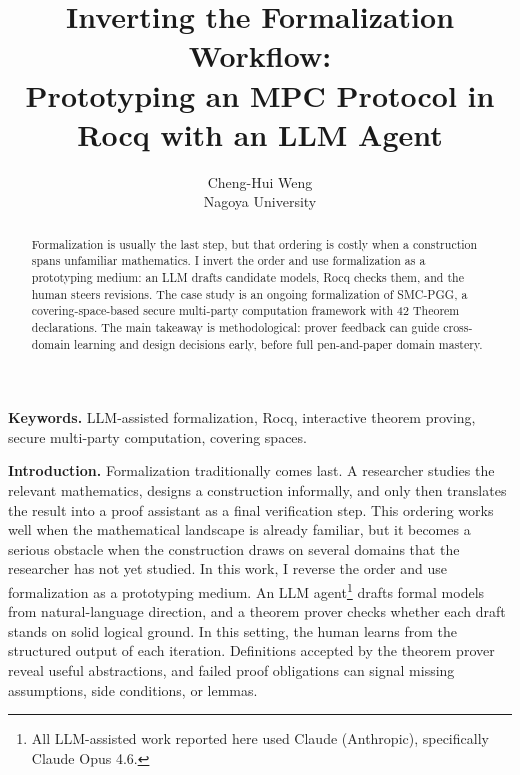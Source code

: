 \documentclass[11pt,a4paper]{article}
\title{Inverting the Formalization Workflow:\\
Prototyping an MPC Protocol in Rocq with an LLM Agent}
\author{Cheng-Hui Weng\\
Nagoya University}
\date{}
\begin{document}
\maketitle
\vspace{-1em}
\thispagestyle{empty}

\begin{abstract}
Formalization is usually the last step, but that ordering is costly when a
construction spans unfamiliar mathematics. I invert the order and use
formalization as a prototyping medium: an LLM drafts candidate models, Rocq
checks them, and the human steers revisions. The case study is an ongoing
formalization of SMC-PGG, a covering-space-based secure multi-party computation
framework with 42 Theorem declarations.
The main takeaway is methodological: prover feedback can guide
cross-domain learning and design decisions early, before full pen-and-paper
domain mastery.
\end{abstract}

\noindent\textbf{Keywords.} LLM-assisted formalization, Rocq, interactive theorem proving, secure multi-party computation, covering spaces.

\noindent\textbf{Introduction.}
Formalization traditionally comes last. A researcher studies the relevant
mathematics, designs a construction informally, and only then translates the
result into a proof assistant as a final verification step. This ordering works
well when the mathematical landscape is already familiar, but it becomes a
serious obstacle when the construction draws on several domains that the
researcher has not yet studied. In this work, I reverse the order and use
formalization as a prototyping medium. An LLM agent\footnote{All LLM-assisted
work reported here used Claude (Anthropic), specifically Claude Opus 4.6.}
drafts formal models from natural-language direction, and a theorem prover
checks whether each draft stands on solid logical ground. In this setting, the
human learns from the structured output of each iteration. Definitions accepted
by the theorem prover reveal useful abstractions, and failed proof obligations can
signal missing assumptions, side conditions, or lemmas.
\end{document}
